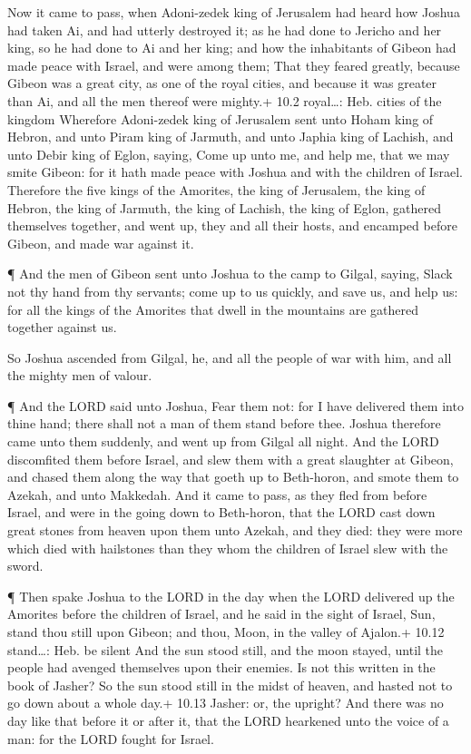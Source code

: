  Now it came to pass, when Adoni-zedek king of Jerusalem had
heard how Joshua had taken Ai, and had utterly destroyed it; as he had
done to Jericho and her king, so he had done to Ai and her king; and how
the inhabitants of Gibeon had made peace with Israel, and were among
them;  That they feared greatly, because Gibeon was a great
city, as one of the royal cities, and because it was greater than Ai,
and all the men thereof were mighty.+ 10.2 royal\ldots: Heb. cities of
the kingdom  Wherefore Adoni-zedek king of Jerusalem sent
unto Hoham king of Hebron, and unto Piram king of Jarmuth, and unto
Japhia king of Lachish, and unto Debir king of Eglon, saying,
 Come up unto me, and help me, that we may smite Gibeon: for
it hath made peace with Joshua and with the children of Israel.
 Therefore the five kings of the Amorites, the king of
Jerusalem, the king of Hebron, the king of Jarmuth, the king of Lachish,
the king of Eglon, gathered themselves together, and went up, they and
all their hosts, and encamped before Gibeon, and made war against it.

 ¶ And the men of Gibeon sent unto Joshua to the camp to
Gilgal, saying, Slack not thy hand from thy servants; come up to us
quickly, and save us, and help us: for all the kings of the Amorites
that dwell in the mountains are gathered together against us.

 So Joshua ascended from Gilgal, he, and all the people of
war with him, and all the mighty men of valour.

 ¶ And the LORD said unto Joshua, Fear them not: for I have
delivered them into thine hand; there shall not a man of them stand
before thee.  Joshua therefore came unto them suddenly, and
went up from Gilgal all night.  And the LORD discomfited
them before Israel, and slew them with a great slaughter at Gibeon, and
chased them along the way that goeth up to Beth-horon, and smote them to
Azekah, and unto Makkedah.  And it came to pass, as they
fled from before Israel, and were in the going down to Beth-horon, that
the LORD cast down great stones from heaven upon them unto Azekah, and
they died: they were more which died with hailstones than they whom the
children of Israel slew with the sword.

 ¶ Then spake Joshua to the LORD in the day when the LORD
delivered up the Amorites before the children of Israel, and he said in
the sight of Israel, Sun, stand thou still upon Gibeon; and thou, Moon,
in the valley of Ajalon.+ 10.12 stand\ldots: Heb. be silent
 And the sun stood still, and the moon stayed, until the
people had avenged themselves upon their enemies. Is not this written in
the book of Jasher? So the sun stood still in the midst of heaven, and
hasted not to go down about a whole day.+ 10.13 Jasher: or, the upright?
 And there was no day like that before it or after it, that
the LORD hearkened unto the voice of a man: for the LORD fought for
Israel.

